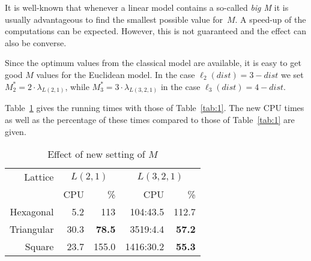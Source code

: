 \documentclass[smallextended]{svjour3}
\begin{document}
It is well-known that whenever a linear model contains a so-called \emph{big M}
it is usually advantageous to find the smallest possible value for~$M$.
A speed-up of the computations can be expected. However, this is not
guaranteed and the effect can also be converse.

\begin{comment}
A good value for $M$ is clearly not smaller than the value that CPLEX
would find for $\lambda+j_1$. But with this property it should
be as small as possible since the bigger the value of $M$ is, the
larger the size of the search space. The fact is that we have more
inequalities, in this point the problem should be more complex. But
the other side, these inequalities can help in the process of Branch-and-Bound,
that can make the calculations faster. So, it should be tried to see
whether the modification is effective in some cases. For this purpose,
we must be able to estimate the results. A correct estimation of the
value multiplied by a constant is already useful (if it is smaller
than the original $M$-value). 
\end{comment}

Since the optimum values from the classical
model are available, it is easy to get good $M$ values for the Euclidean
model. In the case $\ell_{2}(dist)=3-dist$ we set $M_{2}^{*}=2\cdot\lambda_{L(2,1)}$,
while $M_{3}^{*}=3\cdot\lambda_{L(3,2,1)}$ in the case $\ell_{3}(dist)=4-dist$.

Table~\ref{tab:4} gives the running times with those of Table~\ref{tab:1}.
The new CPU times as well as the percentage of these times compared to
those of Table~\ref{tab:1} are given.

\begin{table}[h]
\begin{center}
\renewcommand{\arraystretch}{1.3}
\renewcommand{\tabcolsep}{10pt}
\begin{tabular}{|r||r|r||r|r|}
\hline 
Lattice  & \multicolumn{2}{c||}{$L(2,1)$} & \multicolumn{2}{c|}{$L(3,2,1)$} \\
  & CPU & \% & CPU & \%\\
\hline 
Hexagonal & 5.2 & 113 & 104:43.5 & 112.7 \\
\hline 
Triangular  & 30.3 & \textbf{78.5} & 3519:4.4 & \textbf{57.2} \\
\hline 
Square      & 23.7 & 155.0 & 1416:30.2 & \textbf{55.3} \\ 
\hline 
\end{tabular}
\end{center}
\caption{Effect of new setting of $M$}\label{tab:4}
\end{table}
\end{document}
